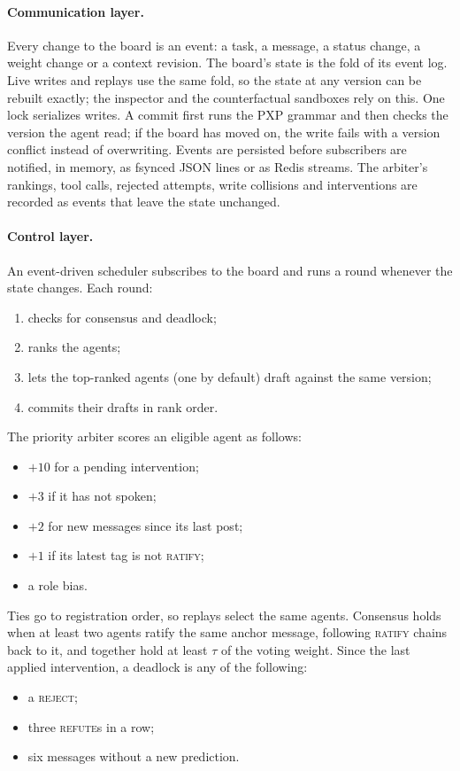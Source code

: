 \documentclass[11pt]{article}
\begin{document}
\paragraph{Communication layer.} Every change to the board is an event: a task, a message, a
status change, a weight change or a context revision. The board's state is the fold of its event
log. Live writes and replays use the same fold, so the state at any version can be rebuilt
exactly; the inspector and the counterfactual sandboxes rely on this. One lock serializes
writes. A commit first runs the PXP grammar and then checks the version the agent read; if the
board has moved on, the write fails with a version conflict instead of overwriting. Events are
persisted before subscribers are notified, in memory, as fsynced JSON lines or as Redis streams.
The arbiter's rankings, tool calls, rejected attempts, write collisions and interventions are
recorded as events that leave the state unchanged.

\paragraph{Control layer.} An event-driven scheduler subscribes to the board and runs a round
whenever the state changes. Each round:
\begin{enumerate}
\item checks for consensus and deadlock;
\item ranks the agents;
\item lets the top-ranked agents (one by default) draft against the same version;
\item commits their drafts in rank order.
\end{enumerate}
The priority arbiter scores an eligible agent as follows:
\begin{itemize}
\item $+10$ for a pending intervention;
\item $+3$ if it has not spoken;
\item $+2$ for new messages since its last post;
\item $+1$ if its latest tag is not \textsc{ratify};
\item a role bias.
\end{itemize}
Ties go to registration order, so replays select the same agents. Consensus holds when at least
two agents ratify the same anchor message, following \textsc{ratify} chains back to it, and
together hold at least $\tau$ of the voting weight. Since the last applied intervention, a
deadlock is any of the following:
\begin{itemize}
\item a \textsc{reject};
\item three \textsc{refute}s in a row;
\item six messages without a new prediction.
\end{itemize}
\end{document}
